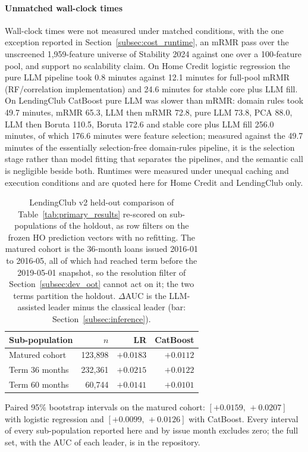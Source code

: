 \documentclass[final,5p,twocolumn]{elsarticle}
\begin{document}
\paragraph{Unmatched wall-clock times}
Wall-clock times were not measured under matched conditions, with the one exception reported in Section~\ref{subsec:cost_runtime}, an mRMR pass over the unscreened 1,959-feature universe of Stability 2024 against one over a 100-feature pool, and support no scalability claim. On Home Credit logistic regression the pure LLM pipeline took 0.8 minutes against 12.1 minutes for full-pool mRMR (RF/correlation implementation) and 24.6 minutes for stable core plus LLM fill. On LendingClub CatBoost pure LLM was slower than mRMR: domain rules took 49.7 minutes, mRMR 65.3, LLM then mRMR 72.8, pure LLM 73.8, PCA 88.0, LLM then Boruta 110.5, Boruta 172.6 and stable core plus LLM fill 256.0 minutes, of which 176.6 minutes were feature selection; measured against the 49.7 minutes of the essentially selection-free domain-rules pipeline, it is the selection stage rather than model fitting that separates the pipelines, and the semantic call is negligible beside both. Runtimes were measured under unequal caching and execution conditions and are quoted here for Home Credit and LendingClub only.

\begin{table}[htbp]
\centering
\footnotesize
\begin{threeparttable}
\caption{LendingClub v2 held-out comparison of Table~\ref{tab:primary_results} re-scored on sub-populations of the holdout, as row filters on the frozen HO prediction vectors with no refitting. The matured cohort is the 36-month loans issued 2016-01 to 2016-05, all of which had reached term before the 2019-05-01 snapshot, so the resolution filter of Section~\ref{subsec:dev_oot} cannot act on it; the two terms partition the holdout. $\Delta$AUC is the LLM-assisted leader minus the classical leader (bar: Section~\ref{subsec:inference}).}
\label{tab:lc_maturity}
\setlength{\tabcolsep}{5pt}
\begin{tabular}{@{}lrrr@{}}
\toprule
Sub-population & $n$ & LR & CatBoost \\
\midrule
Matured cohort\tnote{a} & 123,898 & $+0.0183$ & $+0.0112$ \\
Term 36 months & 232,361 & $+0.0215$ & $+0.0122$ \\
Term 60 months & 60,744 & $+0.0141$ & $+0.0101$ \\
\bottomrule
\end{tabular}
\begin{tablenotes}\footnotesize
\item[a] Paired 95\% bootstrap intervals on the matured cohort: $[+0.0159,\,+0.0207]$ with logistic regression and $[+0.0099,\,+0.0126]$ with CatBoost. Every interval of every sub-population reported here and by issue month excludes zero; the full set, with the AUC of each leader, is in the repository.
\end{tablenotes}
\end{threeparttable}
\end{table}
\end{document}
